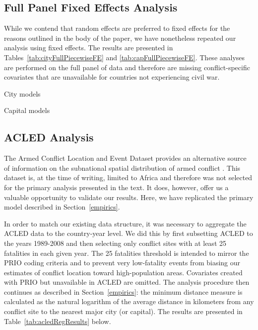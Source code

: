 
\FloatBarrier

\newpage
\subsection{Full Panel Fixed Effects Analysis}

While we contend that random effects are preferred to fixed effects for the reasons outlined in the body of the paper, we have nonetheless repeated our analysis using fixed effects. The results are presented in Tables~\ref{tab:cityFullPiecewiseFE} and \ref{tab:capFullPiecewiseFE}. These analyses are performed on the full panel of data and therefore are missing conflict-specific covariates that are unavailable for countries not experiencing civil war.

City models

\FloatBarrier

Capital models

\FloatBarrier

\newpage
\subsection{ACLED Analysis}
\label{acled}

The Armed Conflict Location and Event Dataset provides an alternative source of information on the subnational spatial distribution of armed conflict \citep{raleigh:linke:etal:2010}. This dataset is, at the time of writing, limited to Africa and therefore was not selected for the primary analysis presented in the text. It does, however, offer us a valuable opportunity to validate our results. Here, we have replicated the primary model described in Section~\ref{empirics}.

In order to match our existing data structure, it was necessary to aggregate the ACLED data to the country-year level. We did this by first subsetting ACLED to the years 1989-2008 and then selecting only conflict sites with at least 25 fatalities in each given year. The 25 fatalities threshold is intended to mirror the PRIO coding criteria and to prevent very low-fatality events from biasing our estimates of conflict location toward high-population areas. Covariates created with PRIO but unavailable in ACLED are omitted. The analysis procedure then continues as described in Section~\ref{empirics}: the minimum distance measure is calculated as the natural logarithm of the average distance in kilometers from any conflict site to the nearest major city (or capital). The results are presented in Table~\ref{tab:acledRegResults} below. 


\FloatBarrier
\newpage
